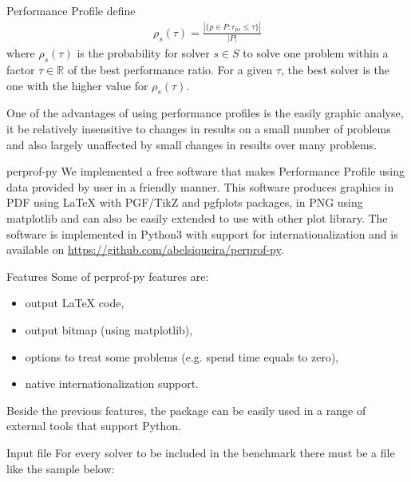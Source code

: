 \documentclass[a0paper,portrait]{baposter}
\begin{document}
\begin{poster}
\begin{posterbox}[column=0,below=auto]{Performance Profile}
    \cite{Dolan2001} define
    \begin{align*}
      \rho_s(\tau) = \frac{| \{p \in P: r_{ps} \leq \tau\} |}{| P |}
    \end{align*}
    where $\rho_s(\tau)$ is the probability for solver $s \in S$ to solve one
    problem within a factor $\tau \in \mathbb{R}$ of the best performance
    ratio. For a given $\tau$, the best solver is the one with the higher
    value for $\rho_s(\tau)$.

    One of the advantages of using performance profiles is the easily graphic
    analyse, it be relatively insensitive to changes in results on a small
    number of problems and also largely unaffected by small changes in
    results over many problems.
  \end{posterbox}

  \begin{posterbox}[column=0,below=auto]{perprof-py}
    We implemented a free software that makes Performance Profile using data
    provided by user in a friendly manner. This software produces graphics in PDF
    using LaTeX with PGF/TikZ\nocite{TikZ} and pgfplots\nocite{pgfplots} packages,
    in PNG using matplotlib\nocite{Hunter:2007} and can also be easily extended to
    use with other plot library. The software is implemented in Python3 with
    support for internationalization and is available on
    \url{https://github.com/abelsiqueira/perprof-py}.
  \end{posterbox}

  \begin{posterbox}[column=0,below=auto]{Features}
    Some of perprof-py features are:
    \begin{itemize}
      \item output LaTeX code,
      \item output bitmap (using matplotlib),
      \item options to treat some problems (e.g. spend time equals to zero),
      \item native internationalization support.
    \end{itemize}

    Beside the previous features, the package can be easily used in a range
    of external tools that support Python.
  \end{posterbox}

  \begin{posterbox}[column=1]{Input file}
    For every solver to be included in the benchmark there must be a file like
    the sample below:


\end{posterbox}
\end{poster}
\end{document}
